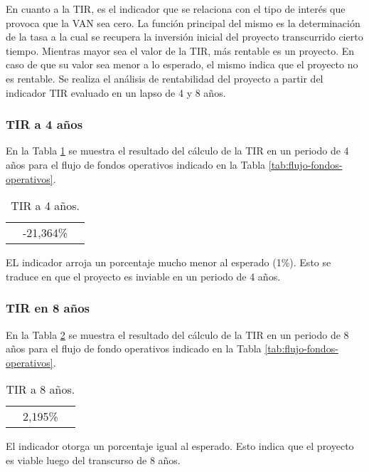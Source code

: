 En cuanto a la TIR, es el indicador que se relaciona con el tipo de interés que provoca que la VAN sea cero. La función principal del mismo es la determinación de la tasa a la cual se recupera la inversión inicial del proyecto transcurrido cierto tiempo. Mientras mayor sea el valor de la TIR, más rentable es un proyecto. En caso de que su valor sea menor a lo esperado, el mismo indica que el proyecto no es rentable. Se realiza el análisis de rentabilidad del proyecto a partir del indicador TIR evaluado en un lapso de 4 y 8 años.

\subsubsection{TIR a 4 años}

En la Tabla \ref{tab:tir-4} se muestra el resultado del cálculo de la TIR en un periodo de 4 años para el flujo de fondos operativos indicado en la Tabla \ref{tab:flujo-fondos-operativos}.

\begin{table}[H]
  \centering
    \begin{tabular}{|cc|r|}
    \rowcolor[rgb]{ .773,  .851,  .945} \multicolumn{3}{c}{\textbf{a 4 años}} \bigstrut[b]\\
    \hline
    \rowcolor[rgb]{ .773,  .851,  .945} \multicolumn{2}{|c|}{\textbf{TIR}} & \cellcolor[rgb]{ 1,  1,  1}-21,364\% \bigstrut\\
    \hline
    \end{tabular}%
  \caption{TIR a 4 años.}    
  \label{tab:tir-4}%
\end{table}%


EL indicador arroja un porcentaje mucho menor al esperado (1\%). Esto se traduce en que el proyecto es inviable en un periodo de 4 años.

\subsubsection{TIR en 8 años}

En la Tabla \ref{tab:tir-8} se muestra el resultado del cálculo de la TIR en un periodo de 8 años para el flujo de fondo operativos indicado en la Tabla \ref{tab:flujo-fondos-operativos}.

\begin{table}[H]
  \centering
    \begin{tabular}{|cc|r|}
    \rowcolor[rgb]{ .773,  .851,  .945} \multicolumn{3}{c}{\textbf{a 8 años}} \bigstrut[b]\\
    \hline
    \rowcolor[rgb]{ .773,  .851,  .945} \multicolumn{2}{|c|}{\textbf{TIR}} & \cellcolor[rgb]{ 1,  1,  1}2,195\% \bigstrut\\
    \hline
    \end{tabular}%
  \caption{TIR a 8 años.}    
  \label{tab:tir-8}%
\end{table}%


El indicador otorga un porcentaje igual al esperado. Esto indica que el proyecto es viable luego del transcurso de 8 años.
